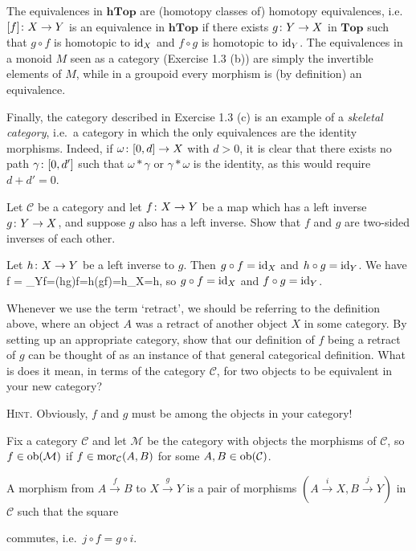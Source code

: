 The equivalences in $\mathbf{hTop}$ are (homotopy classes of) homotopy equivalences, i.e.\ $[f]\colon X\to Y$ is an equivalence in $\mathbf{hTop}$ if there exists $g\colon Y \to X$ in $\mathbf{Top}$ such that $g\circ f$ is homotopic to $\mathrm{id}_X$ and $f\circ g$ is homotopic to $\mathrm{id}_Y$.
\een
The equivalences in a monoid $M$ seen as a category (Exercise 1.3 (b)) are simply the invertible elements of $M$, while in a groupoid every morphism is (by definition) an equivalence.

Finally, the category described in Exercise 1.3 (c) is an example of a \emph{skeletal category}, i.e.\ a category in which the only equivalences are the identity morphisms. Indeed, if $\omega\colon [0,d]\to X$ with $d>0$, it is clear that there exists no path $\gamma\colon [0,d']$ such that $\omega * \gamma$ or $\gamma * \omega$ is the identity, as this would require $d+d'=0$.
\een
\es

\bp
Let $\mathcal{C}$ be a category and let $f \colon X \to Y$ be a map which has a left inverse $g \colon Y \to X$, and suppose $g$ also has a left inverse. Show that $f$ and $g$ are two-sided inverses of each other.
\ep

\bs
Let $h\colon X\to Y$ be a left inverse to $g$. Then $g\circ f=\mathrm{id}_X$ and $h\circ g=\mathrm{id}_Y$. We have
\bse
f = \id_Y\circ f=(h\circ g)\circ f=h\circ (g\circ f)=h\circ \id_X=h,
\ese
so $g\circ f=\mathrm{id}_X$ and $f\circ g=\mathrm{id}_Y$.
\es


\bx
Whenever we use the term `retract', we should be referring to the definition above, where an object $A$ was a retract of another object $X$ in some category. By setting up an appropriate category, show that our definition of $f$ being a retract of $g$ can be thought of as an instance of that general categorical definition. What is does it mean, in terms of the category $\mathcal{C}$, for two objects to be equivalent in your new category?

{\scshape Hint}. Obviously, $f$ and $g$ must be among the objects in your category!
\ex

\bs
Fix a category $\mathcal{C}$ and let $\mathcal{M}$ be the category with objects the morphisms of $\mathcal{C}$, so $f\in \operatorname{ob}(\mathcal{M})$ if $f\in \operatorname{mor}_{\mathcal{C}}(A,B)$ for some $A,B\in \operatorname{ob}(\mathcal{C})$.

A morphism from $A\xrightarrow{f}B$ to $X\xrightarrow{g}Y$ is a pair of morphisms $(A\xrightarrow{i}X,B\xrightarrow{j}Y)$ in $\mathcal{C}$ such that the square
\bse
{}
\ese
commutes, i.e.\ $j\circ f=g\circ i$.

